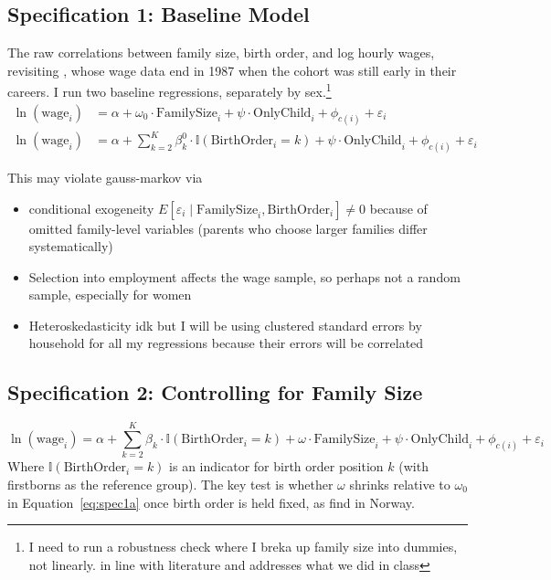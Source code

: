 \documentclass[12pt]{article}
\begin{document}
\subsection*{Specification 1: Baseline Model}
The raw correlations between family size, birth order, and log hourly wages, revisiting \citet{kess}, whose wage data end in 1987 when the cohort was still early in their careers. I run two baseline regressions, separately by sex.\footnote{I need to run a robustness check where I breka up family size into dummies, not linearly. in line with literature and addresses what we did in class}
\begin{align}
\ln(\text{wage}_{i}) &= \alpha + \omega_0 \cdot \text{FamilySize}_i + \psi \cdot \text{OnlyChild}_i + \phi_{c(i)} + \varepsilon_{i} \label{eq:spec1a} \\
\ln(\text{wage}_{i}) &= \alpha + \sum_{k=2}^{K} \beta^0_k \cdot \mathbb{I}(\text{BirthOrder}_i = k) + \psi \cdot \text{OnlyChild}_i + \phi_{c(i)} + \varepsilon_{i} \label{eq:spec1b}
\end{align}

This may violate gauss-markov via
\begin{itemize}
    \item conditional exogeneity $E[\varepsilon_i \mid \text{FamilySize}_i, \text{BirthOrder}_i] \neq 0$ because of omitted family-level variables (parents who choose larger families differ systematically) \citep{black, angrist}
    \item Selection into employment affects the wage sample, so perhaps not a random sample, especially for women 
    \item Heteroskedasticity idk but I will be using clustered standard errors by household for all my regressions because their errors will be correlated
\end{itemize}

\subsection*{Specification 2: Controlling for Family Size}
\begin{equation}
\ln(\text{wage}_{i}) = \alpha + \sum_{k=2}^{K} \beta_k \cdot \mathbb{I}(\text{BirthOrder}_i = k) + \omega \cdot \text{FamilySize}_i + \psi \cdot \text{OnlyChild}_i + \phi_{c(i)} + \varepsilon_{i} \label{eq:spec2}
\end{equation}
Where $\mathbb{I}(\text{BirthOrder}_i = k)$ is an indicator for birth order position $k$ (with firstborns as the reference group). The key test is whether $\omega$ shrinks relative to $\omega_0$ in Equation~\eqref{eq:spec1a} once birth order is held fixed, as \citet{black} find in Norway. 
\end{document}
